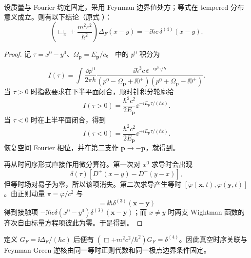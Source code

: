 \begin{proposition}
设质量与 Fourier 约定固定，采用 Feynman 边界值处方；等式在 tempered 分布意义成立。则有以下结论（原式 ）：
\begin{equation*}
\boxed{
\left(\Box_x+\frac{m^2c^2}{\hbar^2}\right)\Delta_F(x-y)
=-\ii\hbar c\,\delta^{(4)}(x-y).}
\end{equation*}
\end{proposition}
\begin{proof}
记 $\tau=x^0-y^0$、$\Omega_{\mathbf p}=E_{\mathbf p}/c$。 中的 $p^0$ 积分为

\begin{equation*}
I(\tau)=\int\frac{\dd p^0}{2\pi\hbar}
\frac{\ii\hbar^3c\,\ee^{-ip^0\tau/\hbar}}
{(p^0-\Omega_{\mathbf p}+\ii0^+)(p^0+\Omega_{\mathbf p}-\ii0^+)}.
\end{equation*}
当 $\tau>0$ 时指数要求在下半平面闭合，顺时针积分轮廓给
\begin{equation*}
I(\tau>0)=\frac{\hbar^2c^2}{2E_{\mathbf p}}
 \ee^{-iE_{\mathbf p}\tau/(\hbar c)}.
\end{equation*}
当 $\tau<0$ 时在上半平面闭合，得到
\begin{equation*}
I(\tau<0)=\frac{\hbar^2c^2}{2E_{\mathbf p}}
 \ee^{+iE_{\mathbf p}\tau/(\hbar c)}.
\end{equation*}
恢复空间 Fourier 相位，并在第二支作 $\mathbf p\to-\mathbf p$，就得到。

再从时间序形式直接作用微分算符。第一次对 $x^0$ 求导时会出现
\begin{equation*}
\delta(\tau)[D^+(x-y)-D^+(y-x)],
\end{equation*}
但等时场对易子为零，所以该项消失。第二次求导产生等时 $[\dot\varphi(\mathbf x,t),\varphi(\mathbf y,t)]$。由正则动量 $\pi=\dot\varphi/c^2$ 与
\begin{equation*}
[\varphi(\mathbf x,t),\pi(\mathbf y,t)]=\ii\hbar\delta^{(3)}(\mathbf x-\mathbf y)
\end{equation*}
得到接触项 $-\ii\hbar c\delta(x^0-y^0)\delta^{(3)}(\mathbf x-\mathbf y)$；而 $x\ne y$ 时两支 Wightman 函数的齐次自由标量方程项彼此为零。于是得到。
\end{proof}

定义 $G_F=\ii\Delta_F/(\hbar c)$ 后便有 $(\Box+m^2c^2/\hbar^2)G_F=\delta^{(4)}$。因此真空时序关联与 Feynman Green 逆核由同一等时正则代数和同一极点边界条件固定。

